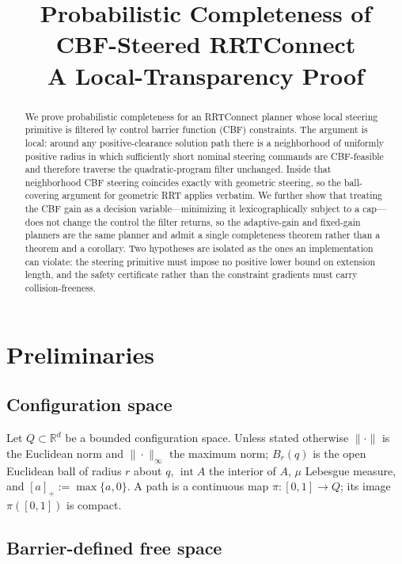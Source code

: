 \documentclass[11pt]{article}
\title{Probabilistic Completeness of CBF-Steered RRTConnect\\
\large A Local-Transparency Proof}
\author{}
\date{}
\theoremstyle{remark}
\newcommand{\R}{\mathbb{R}}
\newcommand{\interior}{\operatorname{int}}
\begin{document}
\maketitle

\begin{abstract}
We prove probabilistic completeness for an RRTConnect planner whose local steering
primitive is filtered by control barrier function (CBF) constraints. The argument is
local: around any positive-clearance solution path there is a neighborhood of uniformly
positive radius in which sufficiently short nominal steering commands are CBF-feasible and
therefore traverse the quadratic-program filter unchanged. Inside that neighborhood CBF
steering coincides exactly with geometric steering, so the ball-covering argument for
geometric RRT applies verbatim. We further show that treating the CBF gain as a decision
variable---minimizing it lexicographically subject to a cap---does not change the control
the filter returns, so the adaptive-gain and fixed-gain planners are the same planner and
admit a single completeness theorem rather than a theorem and a corollary. Two hypotheses
are isolated as the ones an implementation can violate: the steering primitive must impose
no positive lower bound on extension length, and the safety certificate rather than the
constraint gradients must carry collision-freeness.
\end{abstract}

\section{Preliminaries}
\label{sec:prelim}

\subsection{Configuration space}

Let $Q\subset\R^d$ be a bounded configuration space. Unless stated otherwise $\|\cdot\|$
is the Euclidean norm and $\|\cdot\|_\infty$ the maximum norm; $B_r(q)$ is the open
Euclidean ball of radius $r$ about $q$, $\interior A$ the interior of $A$, $\mu$ Lebesgue
measure, and $[a]_+:=\max\{a,0\}$. A path is a continuous map $\pi:[0,1]\to Q$; its image
$\pi([0,1])$ is compact.

\subsection{Barrier-defined free space}
\end{document}
